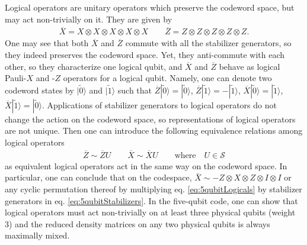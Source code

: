 \documentclass[12pt]{article}
\theoremstyle{plain}
\theoremstyle{plain}
\theoremstyle{plain}
\theoremstyle{plain}
\theoremstyle{result}
\theoremstyle{remark}
\theoremstyle{conjecture}
\theoremstyle{observation}
\theoremstyle{definition}
\theoremstyle{corollary}
\theoremstyle{definition}
\theoremstyle{definition}
\theoremstyle{assumption}
\theoremstyle{definition}
\theoremstyle{problem}
\theoremstyle{fact}
\begin{document}
Logical operators are unitary operators which preserve the codeword space, but may act non-trivially on it. They are given by
\begin{align}\label{eq:5qubitLogicals}
\overline{X}=X\otimes X\otimes X \otimes X \otimes  X \qquad
\overline{Z}=Z\otimes Z\otimes Z \otimes Z \otimes  Z.
\end{align}
One may see that both $\overline{X}$ and $\overline{Z}$ commute with all the stabilizer generators, so they indeed preserves the codeword space. Yet, they anti-commute with each other, so they characterize one logical qubit, and $\overline{X}$ and $\overline{Z}$ behave as logical Pauli-$X$ and -$Z$ operators for a logical qubit. Namely, one can denote two codeword states by $|\tilde{0}\rangle$ and $|\tilde{1}\rangle$ such that $\overline{Z}|\tilde{0}\rangle=|\tilde{0}\rangle$, $\overline{Z}|\tilde{1}\rangle=-|\tilde{1}\rangle$, $\overline{X}|\tilde{0}\rangle=|\tilde{1}\rangle$, $\overline{X}|\tilde{1}\rangle=|\tilde{0}\rangle$. Applications of stabilizer generators to logical operators do not change the action on the codeword space, so representations of logical operators are not unique. 
Then one can introduce the following equivalence relations among logical operators
\begin{align}
\overline{Z}\sim \overline{Z}U \qquad \overline{X}\sim \overline{X}U \qquad \mbox{where} \quad U \in \mathcal{S}
\end{align}
as equivalent logical operators act in the same way on the codeword space.
In particular, one can conclude that on the codespace, $\bar{X} \sim - Z \otimes X \otimes Z \otimes I \otimes I$ or any cyclic permutation thereof by multiplying eq. \ref{eq:5qubitLogicals} by stabilizer generators in eq. \ref{eq:5qubitStabilizers}.
In the five-qubit code, one can show that logical operators must act non-trivially on at least three physical qubits (weight 3) and the reduced density matrices on any two physical qubits is always maximally mixed. 
\end{document}
